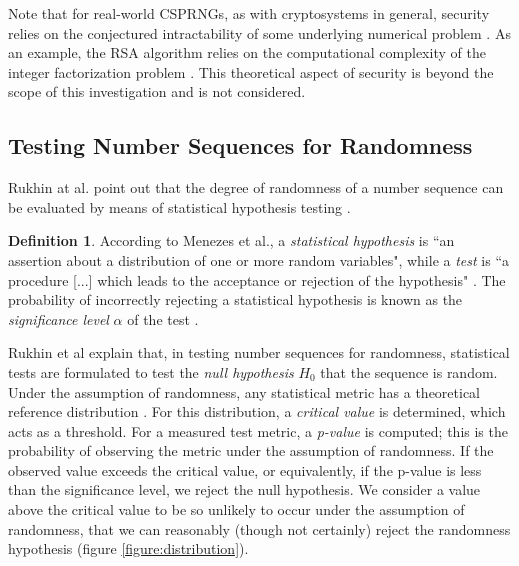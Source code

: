 \documentclass[12pt, titlepage]{report}
\theoremstyle{definition}
\newtheorem{definition}{Definition}
\begin{document}
Note that for real-world CSPRNGs, as with cryptosystems in general, security relies on the conjectured intractability of some underlying numerical problem \cite[p. 185]{menezes1996handbook}. As an example, the RSA algorithm relies on the computational complexity of the integer factorization problem \cite[p. 170-173]{anderson2010security}. This theoretical aspect of security is beyond the scope of this investigation and is not considered.



\subsection{Testing Number Sequences for Randomness}\label{subsection:testing_prngs}
Rukhin at al. point out that the degree of randomness of a number sequence can be evaluated by means of statistical hypothesis testing \cite[s. 1-3]{rukhin2001statistical}.

\begin{definition}
According to Menezes et al., a \emph{statistical hypothesis} is ``an assertion about a distribution of one or more random variables", while a \emph{test} is ``a procedure [...] which leads to the acceptance or rejection of the hypothesis" \cite[p. 179]{menezes1996handbook}. The probability of incorrectly rejecting a statistical hypothesis is known as the \emph{significance level} $\alpha$ of the test \cite[p. 179]{menezes1996handbook}.
\end{definition}

Rukhin et al explain that, in testing number sequences for randomness, statistical tests are formulated to test the \emph{null hypothesis} $H_0$ that the sequence is random. Under the assumption of randomness, any statistical metric has a theoretical reference distribution \cite[p. 1.3]{rukhin2001statistical}. For this distribution, a \emph{critical value} is determined, which acts as a threshold. For a measured test metric, a \emph{p-value} is computed; this is the probability of observing the metric under the assumption of randomness. If the observed value exceeds the critical value, or equivalently, if the p-value is less than the significance level, we reject the null hypothesis. We consider a value above the critical value to be so unlikely to occur under the assumption of randomness, that we can reasonably (though not certainly) reject the randomness hypothesis \cite[p. 1-3,1-4]{rukhin2001statistical} (figure \ref{figure:distribution}).
\end{document}
